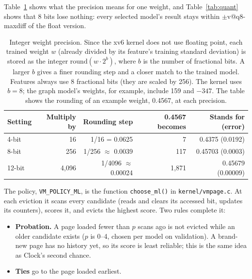 \documentclass[10.5pt,a4paper]{article}
\makeatletter
\newcommand{\code}[1]{\texttt{#1}}
\newcommand{\val}[1]{\csname v@#1\endcsname}
\makeatother
\begin{document}
Table~\ref{tab:bits} shows what the precision means for one weight, and
Table~\ref{tab:quant} shows that 8 bits lose nothing: every selected model's
result stays within $\pm$\val{q8-maxdiff} of the float version.

\begin{table}[!htbp]
\centering\small
\begin{tabular}{@{}lrrrr@{}}
\toprule
\textbf{Setting} & \textbf{Multiply by} & \textbf{Rounding step} & \textbf{0.4567 becomes} & \textbf{Stands for (error)} \\
\midrule
4-bit  & 16    & 1/16 = 0.0625      & 7     & 0.4375 (0.0192) \\
8-bit  & 256   & 1/256 $\approx$ 0.0039   & 117   & 0.45703 (0.0003) \\
12-bit & 4,096 & 1/4096 $\approx$ 0.00024 & 1,871 & 0.45679 (0.00009) \\
\bottomrule
\end{tabular}
\caption{Integer weight precision. Since the xv6 kernel does not use
floating point, each trained weight $w$ (already divided by its feature's
training standard deviation) is stored as the integer
$\mathrm{round}(w \cdot 2^b)$, where $b$ is the number of fractional bits. A
larger $b$ gives a finer rounding step and a closer match to the trained model.
Features always use 8 fractional bits (they are scaled by 256). The kernel uses
$b = 8$; the graph model's weights, for example, include 159 and $-347$. The
table shows the rounding of an example weight, 0.4567, at each precision.}
\label{tab:bits}
\end{table}

\begin{table}[!htbp]
\centering\small

\caption{Float vs.\ integer scoring (faults relative to Clock, simulation,
averaged over 5/10/20\% memory). Compare each integer column with the float
column on the same row: the closer, the less the rounding (Table~\ref{tab:bits})
lost. Differences of about $\pm$0.001 are noise: rounding flips a few close
eviction choices, sometimes for the better.}
\label{tab:quant}
\end{table}

The policy, \code{VM\_POLICY\_ML}, is the function \code{choose\_ml()} in
\code{kernel/vmpage.c}. At each eviction it scans every candidate (reads and
clears its accessed bit, updates its counters), scores it, and evicts the
highest score. Two rules complete it:

\begin{itemize}
\item \textbf{Probation.} A page loaded fewer than $p$ scans ago is not evicted
while an older candidate exists ($p$ is 0--4, chosen per model on
validation). A brand-new page has no history yet, so its score is least
reliable; this is the same idea as Clock's second chance.
\item \textbf{Ties} go to the page loaded earliest.
\end{itemize}
\end{document}
